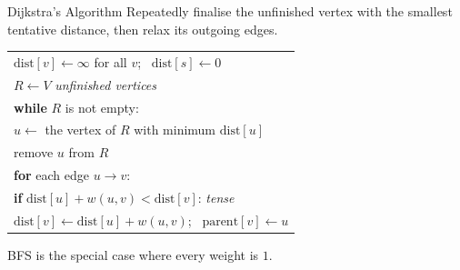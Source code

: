 \documentclass[10pt,aspectratio=169]{beamer}
\begin{document}
\begin{frame}{Dijkstra's Algorithm}
  Repeatedly \alert{finalise} the unfinished vertex with the smallest
  tentative distance, then relax its outgoing edges.

  \bigskip
  \begin{center}
  \begin{tabular}{l}
    $\text{dist}[v] \gets \infty$ for all $v$; \ $\text{dist}[s] \gets 0$ \\
    $R \gets V$ \hfill \textit{unfinished vertices} \\
    \textbf{while} $R$ is not empty: \\
    \quad $u \gets$ the vertex of $R$ with minimum $\text{dist}[u]$ \\
    \quad remove $u$ from $R$ \\
    \quad \textbf{for} each edge $u \to v$: \\
    \quad\quad \textbf{if} $\text{dist}[u] + w(u, v) < \text{dist}[v]$:
               \hfill \textit{tense} \\
    \quad\quad\quad $\text{dist}[v] \gets \text{dist}[u] + w(u, v)$;
                    \ $\text{parent}[v] \gets u$
  \end{tabular}
  \end{center}

  \bigskip
  \begin{center}
    \small BFS is the special case where every weight is $1$.
  \end{center}
\end{frame}
\end{document}
